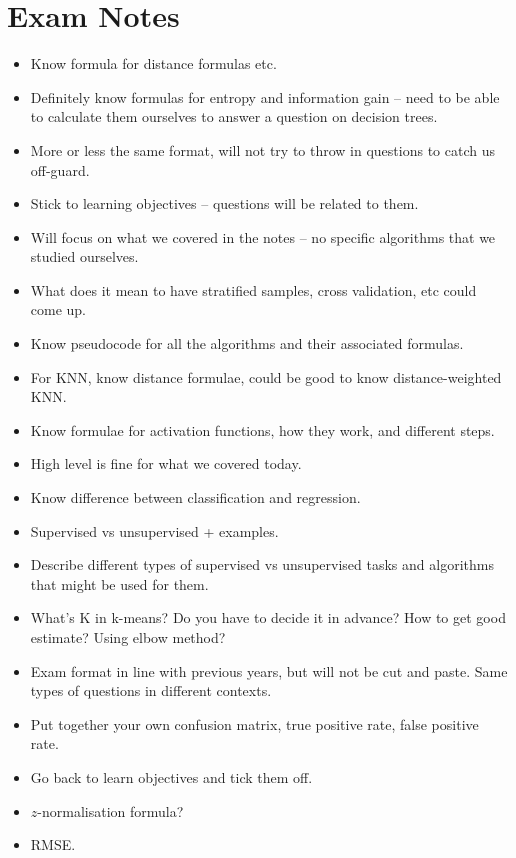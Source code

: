 \documentclass[a4paper,11pt]{article}
\begin{document}
\section{Exam Notes}
\begin{itemize}
    \item   Know formula for distance formulas etc.
    \item   Definitely know formulas for entropy and information gain -- need to be able to calculate them ourselves to answer a question on decision trees.
    \item   More or less the same format, will not try to throw in questions to catch us off-guard.
    \item   Stick to learning objectives -- questions will be related to them.
    \item   Will focus on what we covered in the notes -- no specific algorithms that we studied ourselves.
    \item   What does it mean to have stratified samples, cross validation, etc could come up.
    \item   Know pseudocode for all the algorithms and their associated formulas.
    \item   For KNN, know distance formulae, could be good to know distance-weighted KNN.
    \item   Know formulae for activation functions, how they work, and different steps.
    \item   High level is fine for what we covered today.
    \item   Know difference between classification and regression.
    \item   Supervised vs unsupervised + examples.
    \item   Describe different types of supervised vs unsupervised tasks and algorithms that might be used for them.
    \item   What's K in k-means? Do you have to decide it in advance? How to get good estimate? Using elbow method?
    \item   Exam format in line with previous years, but will not be cut and paste.
            Same types of questions in different contexts.
    \item   Put together your own confusion matrix, true positive rate, false positive rate.
    \item   Go back to learn objectives and tick them off.
    \item   $z$-normalisation formula?
    \item   RMSE.
\end{itemize}
\end{document}
